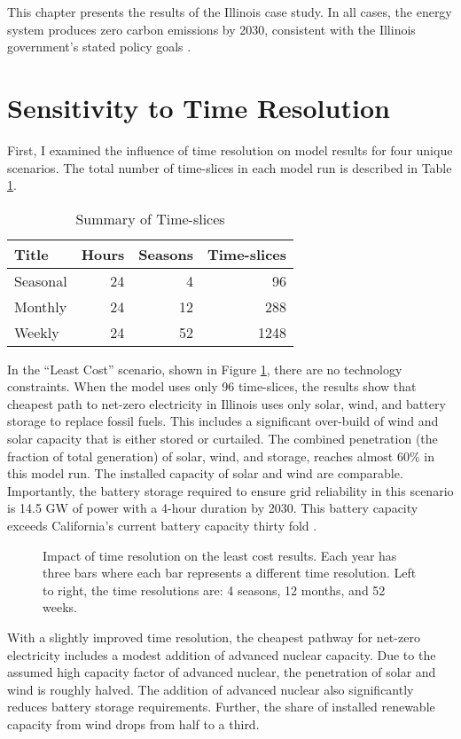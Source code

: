 This chapter presents the results of the Illinois case study. In all cases, the
energy system produces zero carbon emissions by 2030, consistent with the Illinois
government's stated policy goals
\cite{harmon_climate_2021,office_of_governor_jb_pritzker_gov_2021}.
\section{Sensitivity to Time Resolution}
\label{section:time_res}

First, I examined the influence of time resolution on model results for four
unique scenarios. The total number of time-slices in each model run is
described in Table \ref{tab:time-slices}.

\begin{table}[H]
  \centering
  \caption{Summary of Time-slices}
  \label{tab:time-slices}
  \begin{tabular}{lrrr}
    \toprule
    Title & Hours & Seasons & Time-slices \\
    \midrule
    Seasonal & 24 & 4 & 96\\
    Monthly & 24 & 12 & 288\\
    Weekly & 24 & 52 & 1248\\
    \bottomrule
  \end{tabular}
\end{table}
In the ``Least Cost'' scenario, shown in Figure \ref{fig:time_res_LC},
there are no technology constraints. When the model uses only 96 time-slices,
the results show that cheapest path to net-zero electricity in Illinois uses
only solar, wind, and battery storage to replace fossil fuels. This includes
a significant over-build of wind and solar capacity that is either stored
or curtailed. The combined penetration (the fraction of total generation)
of solar, wind, and storage, reaches almost 60\% in this model run. The installed
capacity of solar and wind are comparable. Importantly, the battery storage
required to ensure grid reliability in this scenario is 14.5 GW of power with
a 4-hour duration by 2030. This battery capacity exceeds California's current
battery capacity thirty fold \cite{hutchins_us_2021}.

\begin{figure}[H]
  \centering
  \resizebox{0.95\columnwidth}{!}{}
  \caption{Impact of time resolution on the least cost results. Each year has three bars where
  each bar represents a different time resolution. Left to right, the time resolutions are: 4
  seasons, 12 months, and 52 weeks.}
  \label{fig:time_res_LC}
\end{figure}
With a slightly improved time resolution, the cheapest pathway for net-zero
electricity includes a modest addition of advanced nuclear capacity. Due to
the assumed high capacity factor of advanced nuclear, the penetration of solar
and wind is roughly halved. The addition of advanced nuclear also significantly
reduces battery storage requirements. Further, the share of installed renewable
capacity from wind drops from half to a third.

